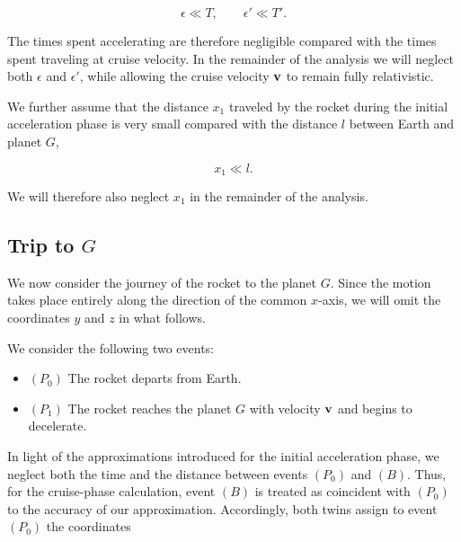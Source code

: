 \documentclass[12pt]{article}
\begin{document}
\begin{equation}
  \epsilon \ll T,
  \qquad
  \epsilon' \ll T'.
  \label{eq:negligible_acceleration_times}
\end{equation}

The times spent accelerating are therefore negligible compared with the times spent
traveling at cruise velocity. In the remainder of the analysis we will neglect both
$\epsilon$ and $\epsilon'$, while allowing the cruise velocity $\vb v$ to remain fully
relativistic. \par

We further assume that the distance $x_1$ traveled by the rocket during the initial
acceleration phase is very small compared with the distance $l$ between Earth and
planet $G$,

\[
  x_1 \ll l.
\]

We will therefore also neglect $x_1$ in the remainder of the analysis.

 
\subsection{Trip to $G$}

We now consider the journey of the rocket to the planet $G$. Since the motion takes
place entirely along the direction of the common $x$-axis, we will omit the coordinates
$y$ and $z$ in what follows. \par


We consider the following two events:

\begin{itemize}
  \item $(P_0)$ The rocket departs from Earth.

  \item $(P_1)$ The rocket reaches the planet $G$ with velocity $\vb v$ and begins
  to decelerate.
\end{itemize}

In light of the approximations introduced for the initial acceleration phase, we neglect
both the time and the distance between events $(P_0)$ and $(B)$. Thus, for the cruise-phase
calculation, event $(B)$ is treated as coincident with $(P_0)$ to the accuracy of our
approximation. Accordingly, both twins assign to event $(P_0)$ the coordinates
\end{document}
